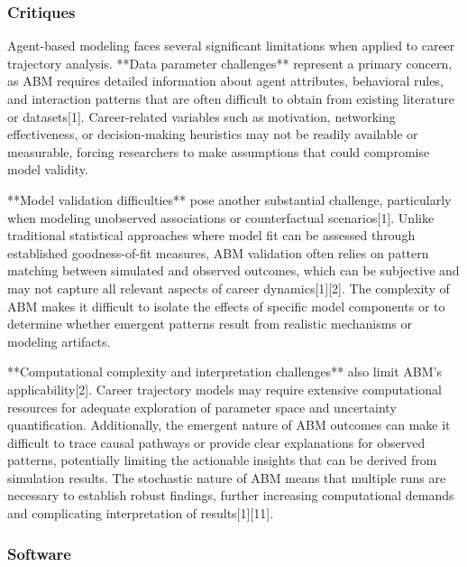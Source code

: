 \documentclass[main.tex]{subfiles}
\begin{document}
\subsubsection{Critiques}

Agent-based modeling faces several significant limitations when applied to career trajectory analysis. **Data parameter challenges** represent a primary concern, as ABM requires detailed information about agent attributes, behavioral rules, and interaction patterns that are often difficult to obtain from existing literature or datasets[1]. Career-related variables such as motivation, networking effectiveness, or decision-making heuristics may not be readily available or measurable, forcing researchers to make assumptions that could compromise model validity.

**Model validation difficulties** pose another substantial challenge, particularly when modeling unobserved associations or counterfactual scenarios[1]. Unlike traditional statistical approaches where model fit can be assessed through established goodness-of-fit measures, ABM validation often relies on pattern matching between simulated and observed outcomes, which can be subjective and may not capture all relevant aspects of career dynamics[1][2]. The complexity of ABM makes it difficult to isolate the effects of specific model components or to determine whether emergent patterns result from realistic mechanisms or modeling artifacts.

**Computational complexity and interpretation challenges** also limit ABM's applicability[2]. Career trajectory models may require extensive computational resources for adequate exploration of parameter space and uncertainty quantification. Additionally, the emergent nature of ABM outcomes can make it difficult to trace causal pathways or provide clear explanations for observed patterns, potentially limiting the actionable insights that can be derived from simulation results. The stochastic nature of ABM means that multiple runs are necessary to establish robust findings, further increasing computational demands and complicating interpretation of results[1][11].

\subsubsection{Software}
\end{document}
